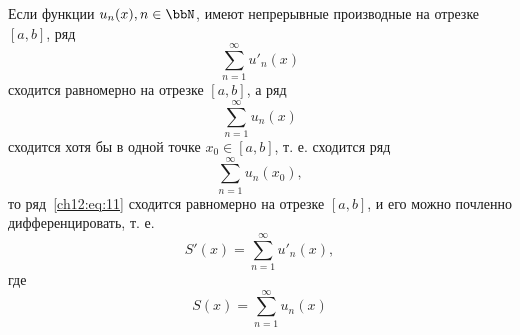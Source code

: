 \begin{thm}
	Если функции $u_n(x), n \in \bbN$, имеют непрерывные производные на отрезке $[a, b]$, ряд
	\begin{equation}
		\label{ch12:eq:10}
		\sum_{n=1}^{\infty} u'_n(x)
	\end{equation}
	сходится равномерно на отрезке $[a, b]$, а ряд
	\begin{equation}
		\label{ch12:eq:11}
		\sum_{n=1}^{\infty} u_n(x)
	\end{equation}
	сходится хотя бы в одной точке $x_0 \in [a, b]$, т. е. сходится ряд
	\begin{equation}
		\label{ch12:eq:12}
		\sum_{n=1}^{\infty} u_n(x_0),
	\end{equation}
	то ряд~\eqref{ch12:eq:11} сходится равномерно на отрезке $[a, b]$,
	и его можно почленно дифференцировать, т. е.
	\begin{equation}
		\label{ch12:eq:13}
		S'(x) = \sum_{n=1}^{\infty} u'_n(x),
	\end{equation}
	где
	\begin{equation}
		\label{ch12:eq:14}
		S(x) = \sum_{n=1}^{\infty} u_n(x)
	\end{equation}
\end{thm}
